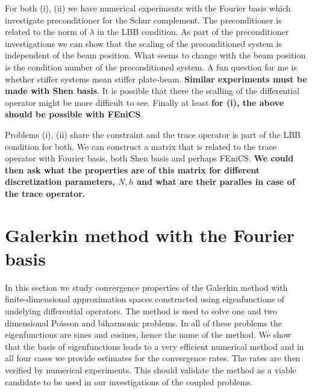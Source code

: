\documentclass[a4paper,10pt]{article}
\begin{document}
  For both (i), (ii) we have numerical experiments with the Fourier basis which
  investigate preconditioner for the Schur complement. The preconditioner is
  related to the norm of $\lambda$ in the LBB condition. As part of the
  preconditioner investigations we can show that the scaling of the preconditioned
  system is independent of the beam position. What seems to change
  with the beam position is the condition number of the preconditioned system.
  A fun question for me is whether stiffer systems mean stiffer plate-beam. 
  \textbf{Similar experiments must be made with Shen basis}. It is possible that
  there the scalling of the differential operator might be more difficult to see.
  Finally at least \textbf{for (i), the above should be possible with FEniCS}.

  Problems (i), (ii) share the constraint and the trace operator is part of the
  LBB condition for both. We can construct a matrix that is related to the trace
  operator with Fourier basis, both Shen basis and perhaps FEniCS. \textbf{We
  could then ask what the properties are of this matrix for different discretization
  parameters, $N, h$ and what are their paralles in case of the trace operator.}


  \section{Galerkin method with the Fourier basis}
  In this section we study convergence properties of the Galerkin method with 
  finite-dimensional approximation spaces constructed using eigenfunctions of
  undelying differential operators. The method is used to solve one and two
  dimensional Poisson and biharmonic problems. In all of these problems the 
  eigenfunctions are sines and cosines, hence the name of the method. We show 
  that the basis of eigenfunctions leads to a very efficient numerical method
  and in all four cases we provide estimates for the convergence rates.
  The rates are then verified by numerical experiments. This should validate
  the method as a viable candidate to be used in our investigations of the
  coupled problems.
\end{document}
